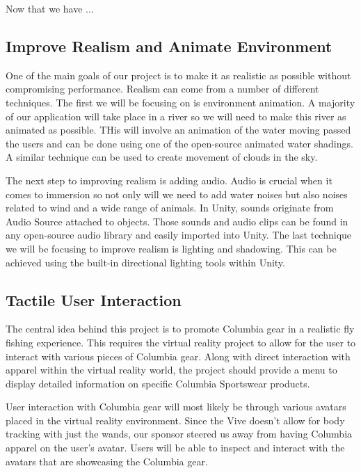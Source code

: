 \documentclass[10pt,journal,compsoc,onecolumn, draftclsnofoot]{IEEEtran}
\begin{document}
Now that we have ...

\subsection{Improve Realism and Animate Environment}
One of the main goals of our project is to make it as realistic as possible
without compromising performance. Realism can come from a number of different
techniques. The first we will be focusing on is environment animation. A
majority of our application will take place in a river so we will need to make
this river as animated as possible. THis will involve an animation of the
water moving passed the users and can be done using one of the open-source
animated water shadings. A similar technique can be used to create movement of
clouds in the sky.

The next step to improving realism is adding audio. Audio is crucial when it
comes to immersion so not only will we need to add water noises but also noises
related to wind and a wide range of animals. In Unity, sounds originate from
Audio Source attached to objects. Those sounds and audio clips can be found in
any open-source audio library and easily imported into Unity. The last
technique we will be focusing to improve realism is lighting and shadowing.
This can be achieved using the built-in directional lighting tools within Unity.

\subsection{Tactile User Interaction}
The central idea behind this project is to promote Columbia gear in a realistic fly fishing experience. This requires the virtual reality project to allow for the user to interact with various pieces of Columbia gear. Along with direct interaction with apparel within the virtual reality world, the project should provide a menu to display detailed information on specific Columbia Sportswear products.

User interaction with Columbia gear will most likely be through various avatars placed in the virtual reality environment. Since the Vive doesn't allow for body tracking with just the wands, our sponsor steered us away from having Columbia apparel on the user's avatar. Users will be able to inspect and interact with the avatars that are showcasing the Columbia gear.
\end{document}
